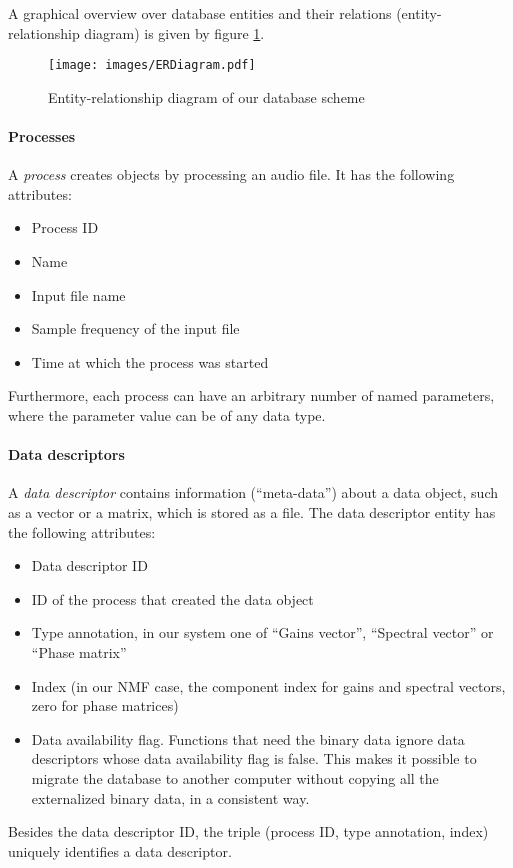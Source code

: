 \label{subsection:DatabaseEntities}

A graphical overview over database entities and their relations
(entity-relationship diagram) is given by figure \ref{figure:ER}.

\begin{figure}
    \texttt{[image: images/ERDiagram.pdf]}
    \caption{%
        \label{figure:ER}
        Entity-relationship diagram of our database scheme
    }
\end{figure}


\paragraph{Processes}

A \emph{process} creates objects by processing an audio file. It has the
following attributes:
\begin{itemize}
    \item   Process ID
    \item   Name
    \item   Input file name
    \item   Sample frequency of the input file
    \item   Time at which the process was started
\end{itemize}
Furthermore, each process can have an arbitrary number of named parameters,
where the parameter value can be of any data type.


\paragraph{Data descriptors}

A \emph{data descriptor} contains information (``meta-data'') about a data
object, such as a vector or a matrix, which is stored as a file. The data
descriptor entity has the following attributes:
\begin{itemize}
    \item Data descriptor ID
    \item ID of the process that created the data object
    \item Type annotation, in our system one of ``Gains vector'', ``Spectral
      vector'' or ``Phase matrix''
    \item Index (in our NMF case, the component index for gains and spectral
      vectors, zero for phase matrices)
    \item Data availability flag. Functions that need the binary data ignore
      data descriptors whose data availability flag is false. This makes it
      possible to migrate the database to another computer without copying all
      the externalized binary data, in a consistent way.
\end{itemize}
Besides the data descriptor ID, the triple (process ID, type annotation, index)
uniquely identifies a data descriptor.


